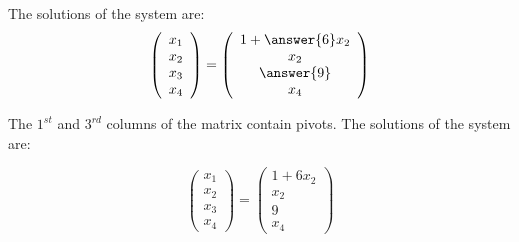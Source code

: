 \documentclass{ximera}
\begin{document}
     \begin{exercise}
       The solutions of the system are:
\[
\left(\begin{array}{r} x_1 \\ x_2 \\ x_3\\ x_4\end{array} \right)
= \left(\begin{array}{c} 1 + \answer{6}x_2 \\ x_2 \\ \answer{9} \\ x_4\end{array} \right)
\]

\begin{solution}
The $1^{st}$ and $3^{rd}$ columns of the matrix contain
pivots.  The solutions of the system are:

\[
\left(\begin{array}{r} x_1 \\ x_2 \\ x_3\\ x_4\end{array} \right)
= \left(\begin{array}{c} 1 + 6x_2 \\ x_2 \\ 9 \\ x_4\end{array} \right)
\]

\end{solution}
     \end{exercise}
\end{document}
